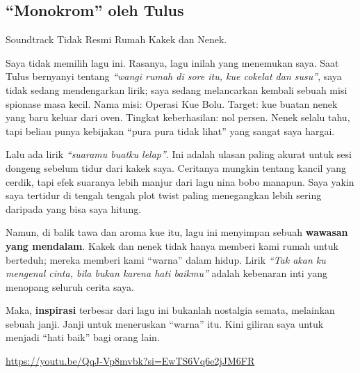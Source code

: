 \documentclass[
  letterpaper,
  DIV=11,
  numbers=noendperiod]{scrreprt}
\begin{document}
\subsection{``Monokrom'' oleh Tulus}\label{monokrom-oleh-tulus}

Soundtrack Tidak Resmi Rumah Kakek dan Nenek.

Saya tidak memilih lagu ini. Rasanya, lagu inilah yang menemukan saya.
Saat Tulus bernyanyi tentang \emph{``wangi rumah di sore itu, kue
cokelat dan susu''}, saya tidak sedang mendengarkan lirik; saya sedang
melancarkan kembali sebuah misi spionase masa kecil. Nama misi: Operasi
Kue Bolu. Target: kue buatan nenek yang baru keluar dari oven. Tingkat
keberhasilan: nol persen. Nenek selalu tahu, tapi beliau punya kebijakan
``pura pura tidak lihat'' yang sangat saya hargai.

Lalu ada lirik \emph{``suaramu buatku lelap''}. Ini adalah ulasan paling
akurat untuk sesi dongeng sebelum tidur dari kakek saya. Ceritanya
mungkin tentang kancil yang cerdik, tapi efek suaranya lebih manjur dari
lagu nina bobo manapun. Saya yakin saya tertidur di tengah tengah plot
twist paling menegangkan lebih sering daripada yang bisa saya hitung.

Namun, di balik tawa dan aroma kue itu, lagu ini menyimpan sebuah
\textbf{wawasan yang mendalam}. Kakek dan nenek tidak hanya memberi kami
rumah untuk berteduh; mereka memberi kami ``warna'' dalam hidup. Lirik
\emph{``Tak akan ku mengenal cinta, bila bukan karena hati baikmu''}
adalah kebenaran inti yang menopang seluruh cerita saya.

Maka, \textbf{inspirasi} terbesar dari lagu ini bukanlah nostalgia
semata, melainkan sebuah janji. Janji untuk meneruskan ``warna'' itu.
Kini giliran saya untuk menjadi ``hati baik'' bagi orang lain.

\url{https://youtu.be/QqJ-Vp8mvbk?si=EwTS6Vq6e2jJM6FR}
\end{document}
